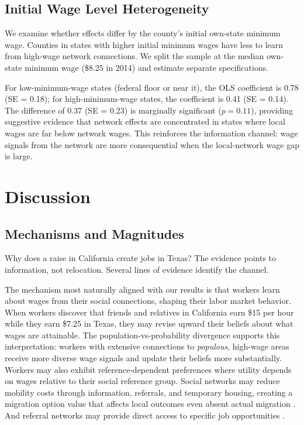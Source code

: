 \documentclass[12pt]{article}
\begin{document}
\subsection{Initial Wage Level Heterogeneity}

We examine whether effects differ by the county's initial own-state minimum wage. Counties in states with higher initial minimum wages have less to learn from high-wage network connections. We split the sample at the median own-state minimum wage (\$8.25 in 2014) and estimate separate specifications.

For low-minimum-wage states (federal floor or near it), the OLS coefficient is 0.78 (SE = 0.18); for high-minimum-wage states, the coefficient is 0.41 (SE = 0.14). The difference of 0.37 (SE = 0.23) is marginally significant ($p = 0.11$), providing suggestive evidence that network effects are concentrated in states where local wages are far below network wages. This reinforces the information channel: wage signals from the network are more consequential when the local-network wage gap is large.


\section{Discussion}
\label{sec:discussion}

\subsection{Mechanisms and Magnitudes}

Why does a raise in California create jobs in Texas? The evidence points to information, not relocation. Several lines of evidence identify the channel.

The mechanism most naturally aligned with our results is that workers learn about wages from their social connections, shaping their labor market behavior. When workers discover that friends and relatives in California earn \$15 per hour while they earn \$7.25 in Texas, they may revise upward their beliefs about what wages are attainable. The population-vs-probability divergence supports this interpretation: workers with extensive connections to \textit{populous}, high-wage areas receive more diverse wage signals and update their beliefs more substantially. Workers may also exhibit reference-dependent preferences where utility depends on wages relative to their social reference group. Social networks may reduce mobility costs through information, referrals, and temporary housing, creating a migration option value that affects local outcomes even absent actual migration \citep{munshi2003networks}. And referral networks may provide direct access to specific job opportunities \citep{kramarz2023}.
\end{document}
